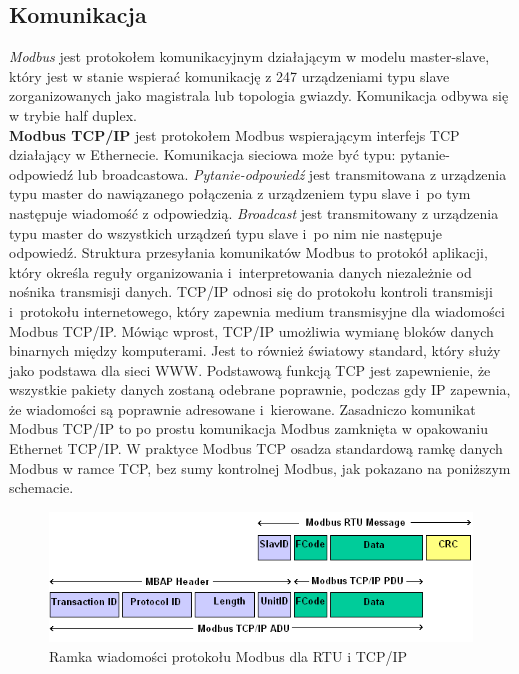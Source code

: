 \documentclass[12pt]{article}
\begin{document}
\subsection{Komunikacja}
\textit{Modbus} jest protokołem komunikacyjnym działającym w modelu master-slave, który jest w stanie wspierać komunikację z 247 urządzeniami typu slave zorganizowanych  jako magistrala lub topologia gwiazdy. Komunikacja odbywa się w trybie half duplex.\\
\textbf{Modbus TCP/IP} jest protokołem Modbus wspierającym interfejs TCP działający w Ethernecie. Komunikacja sieciowa może być typu: pytanie-odpowiedź lub broadcastowa. \textit{Pytanie-odpowiedź} jest transmitowana z urządzenia typu master do nawiązanego połączenia z urządzeniem typu slave i~po tym następuje wiadomość z odpowiedzią. \textit{Broadcast} jest transmitowany z urządzenia typu master do wszystkich urządzeń typu slave i~po nim nie następuje odpowiedź.
Struktura przesyłania komunikatów Modbus to protokół aplikacji, który określa reguły organizowania i~interpretowania danych niezależnie od nośnika transmisji danych. TCP/IP odnosi się do protokołu kontroli transmisji i~protokołu internetowego, który zapewnia medium transmisyjne dla wiadomości Modbus TCP/IP. Mówiąc wprost, TCP/IP umożliwia wymianę bloków danych binarnych między komputerami. Jest to również światowy standard, który służy jako podstawa dla sieci WWW. Podstawową funkcją TCP jest zapewnienie, że wszystkie pakiety danych zostaną odebrane poprawnie, podczas gdy IP zapewnia, że wiadomości są poprawnie adresowane i~kierowane. Zasadniczo komunikat Modbus TCP/IP to
po prostu komunikacja Modbus zamknięta w opakowaniu Ethernet TCP/IP.
W praktyce Modbus TCP osadza standardową ramkę danych Modbus w ramce TCP,
bez sumy kontrolnej Modbus, jak pokazano na poniższym schemacie.


\begin{figure}[H]
  \centering
  \includegraphics[scale=0.5]{adu_pdu}
  \caption{Ramka wiadomości protokołu Modbus dla RTU i TCP/IP}
  \label{fig:my_label}
\end{figure}
\end{document}
